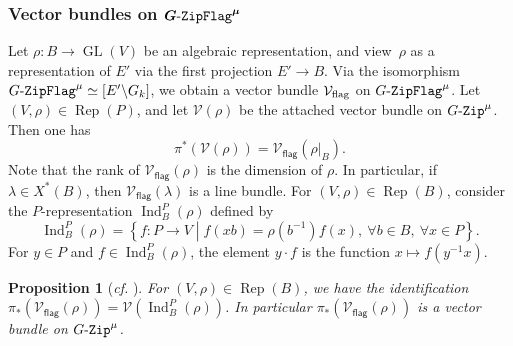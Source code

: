 \documentclass[10pt,a4paper]{article}
\numberwithin{equation}{section}
\newtheorem{proposition}[theorem]{Proposition}
\theoremstyle{definition}
\theoremstyle{remark}
\newcommand{\GZip}{\mathop{\text{$G$-{\tt Zip}}}\nolimits}
\newcommand{\flag}{\mathsf{flag}}
\newcommand{\GF}{\mathop{\text{$G$-{\tt ZipFlag}}}\nolimits}
\newcommand{\Vcal}{{\mathcal V}}
\DeclareMathOperator{\Rep}{Rep}
\DeclareMathOperator{\GL}{GL}
\DeclareMathOperator{\Ind}{Ind}
\newcommand{\relmiddle}[1]{\mathrel{}\middle#1\mathrel{}}
\begin{document}
\subsubsection{Vector bundles on  \texorpdfstring{$\boldsymbol{\GF^\mu}$}{GF\textasciicircum mu}}
Let $\rho \colon B\to \GL(V)$ be an algebraic representation, and view~$\rho$ as a representation of $E'$ via the first projection $E'\to B$. Via the isomorphism $\GF^\mu\simeq [E'\backslash G_k]$, we obtain a vector bundle $\Vcal_{\rm flag}$ on $\GF^\mu$. Let $(V,\rho)\in \Rep(P)$, and let $\Vcal(\rho)$ be the attached vector bundle on $\GZip^\mu$. Then one has
\begin{equation}\label{pullbackV}
\pi^*(\Vcal(\rho))=\Vcal_{\flag}(\rho|_B).
\end{equation}
Note that the rank of $\Vcal_{\flag}(\rho)$ is the dimension of $\rho$. In particular, if $\lambda\in X^*(B)$, then $\Vcal_{\flag}(\lambda)$ is a line bundle. For $(V,\rho)\in \Rep(B)$, consider the $P$-representation $\Ind_B^P(\rho)$ defined by
\begin{equation}\label{eq-Indrho}
\Ind_B^P(\rho)=\left\{f\colon P\to V \relmiddle| f(xb) = \rho\left(b^{-1}\right)f(x), \ \forall b\in B,\ \forall x\in P \right\}.
\end{equation}
For $y\in P$ and $f\in \Ind_B^P(\rho)$, the element $y\cdot f$ is the function $x\mapsto f(y^{-1} x)$.

\begin{proposition}[\textit{cf.} {\cite[Proposition 3.2.1]{Imai-Koskivirta-partial-Hasse}}]\label{prop-push-flag-zip}
For $(V,\rho)\in \Rep(B)$, we have the identification 
$\pi_{*}(\Vcal_{\flag}(\rho))=\Vcal(\Ind_B^P(\rho))$. In particular $\pi_{*}(\Vcal_{\flag}(\rho))$ is a vector bundle on $\GZip^\mu$.
\end{proposition}
\end{document}
